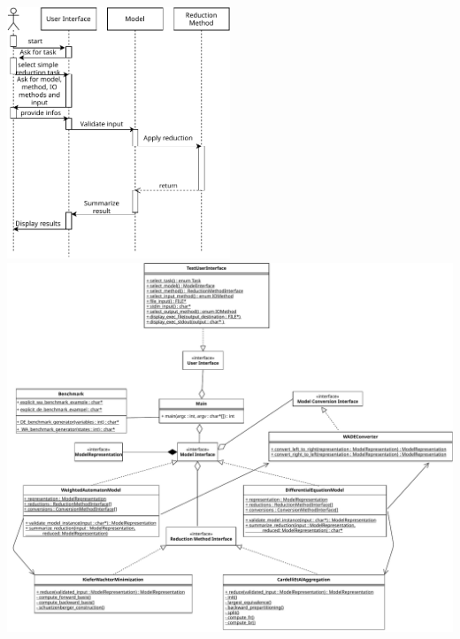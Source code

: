                
            \begin{center}
            \includegraphics[keepaspectratio, width=0.5\textwidth]{img/sequence_simple.pdf} \\
            \noindent\includegraphics[keepaspectratio, width=1.1\textwidth]{img/class.pdf}
            
            \end{center}
